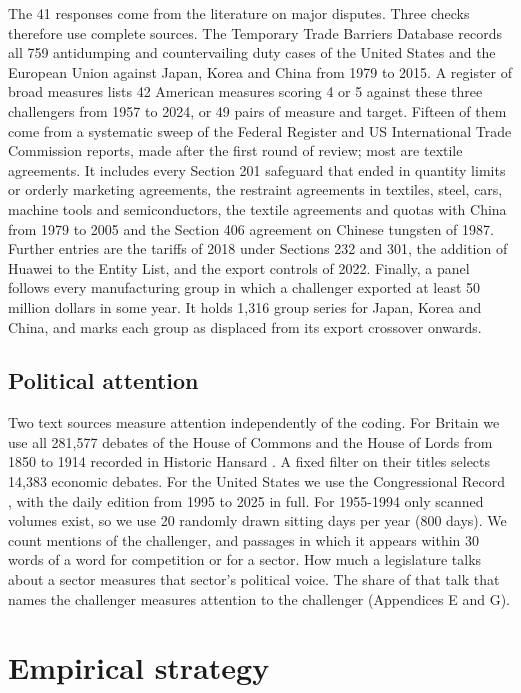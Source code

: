 \documentclass[review,authoryear,12pt]{elsarticle}
\begin{document}
The 41 responses come from the literature on major disputes. Three checks therefore use complete sources. The Temporary Trade Barriers Database \citep{ttbd} records all 759 antidumping and countervailing duty cases of the United States and the European Union against Japan, Korea and China from 1979 to 2015. A register of broad measures lists 42 American measures scoring 4 or 5 against these three challengers from 1957 to 2024, or 49 pairs of measure and target. Fifteen of them come from a systematic sweep of the Federal Register and US International Trade Commission reports, made after the first round of review; most are textile agreements. It includes every Section 201 safeguard that ended in quantity limits or orderly marketing agreements, the restraint agreements in textiles, steel, cars, machine tools and semiconductors, the textile agreements and quotas with China from 1979 to 2005 and the Section 406 agreement on Chinese tungsten of 1987. Further entries are the tariffs of 2018 under Sections 232 and 301, the addition of Huawei to the Entity List, and the export controls of 2022. Finally, a panel follows every manufacturing group in which a challenger exported at least 50 million dollars in some year. It holds 1,316 group series for Japan, Korea and China, and marks each group as displaced from its export crossover onwards.

\subsection{Political attention}

Two text sources measure attention independently of the coding. For Britain we use all 281,577 debates of the House of Commons and the House of Lords from 1850 to 1914 recorded in Historic Hansard \citep{hansard}. A fixed filter on their titles selects 14,383 economic debates. For the United States we use the Congressional Record \citep{crec}, with the daily edition from 1995 to 2025 in full. For 1955-1994 only scanned volumes exist, so we use 20 randomly drawn sitting days per year (800 days). We count mentions of the challenger, and passages in which it appears within 30 words of a word for competition or for a sector. How much a legislature talks about a sector measures that sector's political voice. The share of that talk that names the challenger measures attention to the challenger (Appendices E and G).

\section{Empirical strategy}\label{sec:strategy}
\end{document}
